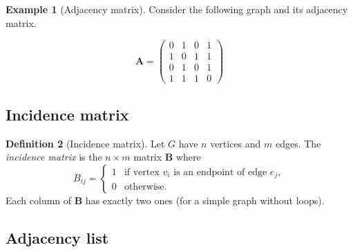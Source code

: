 \documentclass[12pt,a4paper,openany]{book}
\theoremstyle{definition}
\newtheorem{definition}{Definition}[chapter]
\newtheorem{example}[definition]{Example}
\theoremstyle{plain}
\theoremstyle{remark}
\begin{document}
\begin{example}[Adjacency matrix]\label{ex:adj-matrix}
Consider the following graph and its adjacency matrix.

\begin{minipage}{0.45\textwidth}
\centering
{}
\end{minipage}%
\begin{minipage}{0.45\textwidth}
\[
   \mathbf{A} =
   \begin{pmatrix}
     0 & 1 & 0 & 1 \\
     1 & 0 & 1 & 1 \\
     0 & 1 & 0 & 1 \\
     1 & 1 & 1 & 0
   \end{pmatrix}
\]
\end{minipage}
\end{example}

\subsection{Incidence matrix}\label{ssec:inc-matrix}

\begin{definition}[Incidence matrix]\label{def:inc-matrix}
Let $G$ have $n$ vertices and $m$ edges.  The \emph{incidence matrix} is
the $n \times m$ matrix $\mathbf{B}$ where
\[
   B_{ij} =
   \begin{cases}
     1 & \text{if vertex $v_i$ is an endpoint of edge $e_j$}, \\
     0 & \text{otherwise.}
   \end{cases}
\]
Each column of $\mathbf{B}$ has exactly two ones (for a simple graph
without loops).
\end{definition}

\subsection{Adjacency list}\label{ssec:adj-list}
\end{document}
